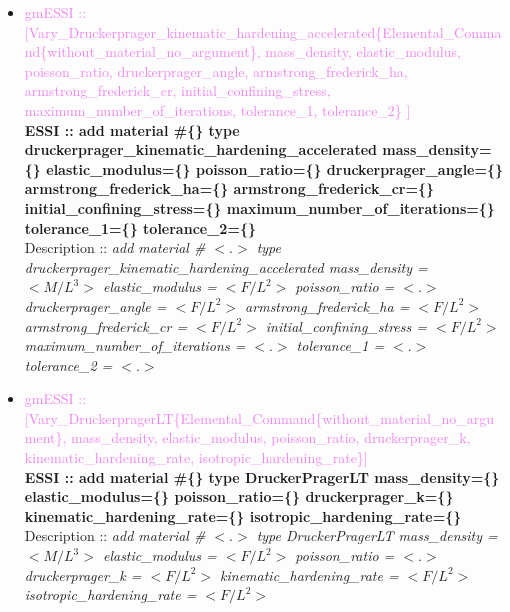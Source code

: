 \documentclass[11pt]{article}
\begin{document}
\begin{itemize}
    \item \textcolor{violet}{gmESSI :: [Vary\_Druckerprager\_kinematic\_hardening\_accelerated\{Elemental\_Command\{without\_material\_no\_argument\}, mass\_density, elastic\_modulus, poisson\_ratio, druckerprager\_angle, armstrong\_frederick\_ha, armstrong\_frederick\_cr, initial\_confining\_stress, maximum\_number\_of\_iterations, tolerance\_1, tolerance\_2\} ]}\\
    \textbf{ESSI :: add material \#\{\} type druckerprager\_kinematic\_hardening\_accelerated mass\_density=\{\} elastic\_modulus=\{\}  poisson\_ratio=\{\} druckerprager\_angle=\{\} armstrong\_frederick\_ha=\{\} armstrong\_frederick\_cr=\{\} initial\_confining\_stress=\{\} maximum\_number\_of\_iterations=\{\} tolerance\_1=\{\} tolerance\_2=\{\}}\\
    Description ::  \textit{ add material \# $<.>$ type druckerprager\_kinematic\_hardening\_accelerated  mass\_density = $<M/L^3>$ elastic\_modulus = $<F/L^2>$  poisson\_ratio = $<.>$ druckerprager\_angle = $<F/L^2>$ armstrong\_frederick\_ha = $<F/L^2>$ armstrong\_frederick\_cr = $<F/L^2>$ initial\_confining\_stress = $<F/L^2>$ maximum\_number\_of\_iterations = $<.>$ tolerance\_1 = $<.>$ tolerance\_2 = $<.>$} 

    \item \textcolor{violet}{gmESSI :: [Vary\_DruckerpragerLT\{Elemental\_Command\{without\_material\_no\_argument\}, mass\_density, elastic\_modulus, poisson\_ratio, druckerprager\_k, kinematic\_hardening\_rate, isotropic\_hardening\_rate\}]}\\
    \textbf{ESSI :: add material \#\{\} type DruckerPragerLT mass\_density=\{\} elastic\_modulus=\{\}  poisson\_ratio=\{\} druckerprager\_k=\{\} kinematic\_hardening\_rate=\{\} isotropic\_hardening\_rate=\{\}}\\
    Description ::  \textit{ add material \# $<.>$ type DruckerPragerLT  mass\_density = $<M/L^3>$ elastic\_modulus = $<F/L^2>$  poisson\_ratio = $<.>$ druckerprager\_k = $<F/L^2>$ kinematic\_hardening\_rate = $<F/L^2>$ isotropic\_hardening\_rate = $<F/L^2>$} 


\end{itemize}
\end{document}
